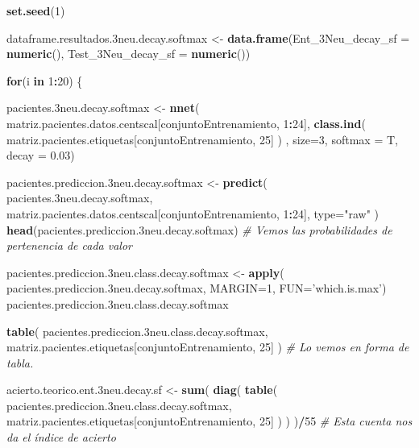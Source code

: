 \documentclass[]{article}
\newenvironment{Shaded}{\begin{snugshade}}{\end{snugshade}}
\newcommand{\KeywordTok}[1]{\textcolor[rgb]{0.13,0.29,0.53}{\textbf{#1}}}
\newcommand{\DataTypeTok}[1]{\textcolor[rgb]{0.13,0.29,0.53}{#1}}
\newcommand{\DecValTok}[1]{\textcolor[rgb]{0.00,0.00,0.81}{#1}}
\newcommand{\FloatTok}[1]{\textcolor[rgb]{0.00,0.00,0.81}{#1}}
\newcommand{\StringTok}[1]{\textcolor[rgb]{0.31,0.60,0.02}{#1}}
\newcommand{\CommentTok}[1]{\textcolor[rgb]{0.56,0.35,0.01}{\textit{#1}}}
\newcommand{\ControlFlowTok}[1]{\textcolor[rgb]{0.13,0.29,0.53}{\textbf{#1}}}
\newcommand{\OperatorTok}[1]{\textcolor[rgb]{0.81,0.36,0.00}{\textbf{#1}}}
\newcommand{\NormalTok}[1]{#1}
\begin{document}
\begin{Shaded}
\begin{Highlighting}[]
\KeywordTok{set.seed}\NormalTok{(}\DecValTok{1}\NormalTok{)}

\NormalTok{dataframe.resultados.3neu.decay.softmax <-}\StringTok{ }\KeywordTok{data.frame}\NormalTok{(}\DataTypeTok{Ent_3Neu_decay_sf =} \KeywordTok{numeric}\NormalTok{(),}
                                                      \DataTypeTok{Test_3Neu_decay_sf =} \KeywordTok{numeric}\NormalTok{())}

\ControlFlowTok{for}\NormalTok{(i }\ControlFlowTok{in} \DecValTok{1}\OperatorTok{:}\DecValTok{20}\NormalTok{)}
\NormalTok{\{}

\NormalTok{  pacientes.3neu.decay.softmax <-}\StringTok{ }\KeywordTok{nnet}\NormalTok{( matriz.pacientes.datos.centscal[conjuntoEntrenamiento, }\DecValTok{1}\OperatorTok{:}\DecValTok{24}\NormalTok{], }\KeywordTok{class.ind}\NormalTok{( matriz.pacientes.etiquetas[conjuntoEntrenamiento, }\DecValTok{25}\NormalTok{] ) , }\DataTypeTok{size=}\DecValTok{3}\NormalTok{, }\DataTypeTok{softmax =}\NormalTok{ T, }\DataTypeTok{decay =} \FloatTok{0.03}\NormalTok{)}
  
\NormalTok{  pacientes.prediccion.3neu.decay.softmax <-}\StringTok{ }\KeywordTok{predict}\NormalTok{( pacientes.3neu.decay.softmax, matriz.pacientes.datos.centscal[conjuntoEntrenamiento, }\DecValTok{1}\OperatorTok{:}\DecValTok{24}\NormalTok{], }\DataTypeTok{type=}\StringTok{"raw"}\NormalTok{ )}
  \KeywordTok{head}\NormalTok{(pacientes.prediccion.3neu.decay.softmax) }\CommentTok{# Vemos las probabilidades de pertenencia de cada valor}
  
  
\NormalTok{  pacientes.prediccion.3neu.class.decay.softmax <-}\StringTok{ }\KeywordTok{apply}\NormalTok{( pacientes.prediccion.3neu.decay.softmax, }\DataTypeTok{MARGIN=}\DecValTok{1}\NormalTok{, }\DataTypeTok{FUN=}\StringTok{'which.is.max'}\NormalTok{)}
\NormalTok{  pacientes.prediccion.3neu.class.decay.softmax}
  
  
  \KeywordTok{table}\NormalTok{( pacientes.prediccion.3neu.class.decay.softmax, matriz.pacientes.etiquetas[conjuntoEntrenamiento, }\DecValTok{25}\NormalTok{] )  }\CommentTok{# Lo vemos en forma de tabla.}
  
  
\NormalTok{  acierto.teorico.ent.3neu.decay.sf <-}\StringTok{ }\KeywordTok{sum}\NormalTok{( }\KeywordTok{diag}\NormalTok{( }\KeywordTok{table}\NormalTok{( pacientes.prediccion.3neu.class.decay.softmax, matriz.pacientes.etiquetas[conjuntoEntrenamiento, }\DecValTok{25}\NormalTok{] ) ) )}\OperatorTok{/}\DecValTok{55} \CommentTok{# Esta cuenta nos da el índice de acierto}
  

\end{Highlighting}
\end{Shaded}
\end{document}
